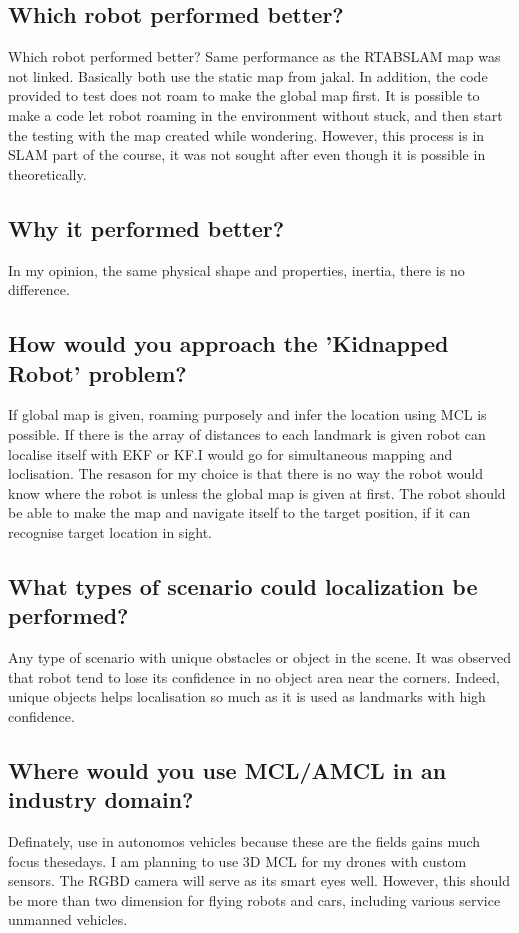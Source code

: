 \documentclass[10pt,journal,compsoc]{IEEEtran}
\begin{document}
\subsection{Which robot performed better?}
Which robot performed better? Same performance as the RTABSLAM map was not linked. Basically both use the static map from jakal. 
In addition, the code provided to test does not roam to make the global map first. It is possible to make a code let robot roaming in the environment without stuck, and then start the testing with the map created while wondering. However, this process is in SLAM part of the course, it was not sought after even though it is possible in theoretically.
\subsection{Why it performed better?}
In my opinion, the same physical shape and properties, inertia, there is no difference.
\subsection{How would you approach the 'Kidnapped Robot' problem?}
If global map is given, roaming purposely and infer the location using MCL is possible. If there is the array of distances to each landmark is given robot can localise itself with EKF or KF.I would go for simultaneous mapping and loclisation. The resason for my choice is that there is no way the robot would know where the robot is unless the global map is given at first. The robot should be able to make the map and navigate itself to the target position, if it can recognise target location in sight. 
\subsection{What types of scenario could localization be performed?}
Any type of scenario with unique obstacles or object in the scene. It was observed that robot tend to lose its confidence in no object area near the corners. Indeed, unique objects helps localisation so much as it is used as landmarks with high confidence.
\subsection{Where would you use MCL/AMCL in an industry domain?}
Definately, use in autonomos vehicles because these are the fields gains much focus thesedays. I am planning to use 3D MCL for my drones with custom sensors. The RGBD camera will serve as its smart eyes well.
However, this should be more than two dimension for flying robots and cars, including various service unmanned vehicles.
\end{document}
